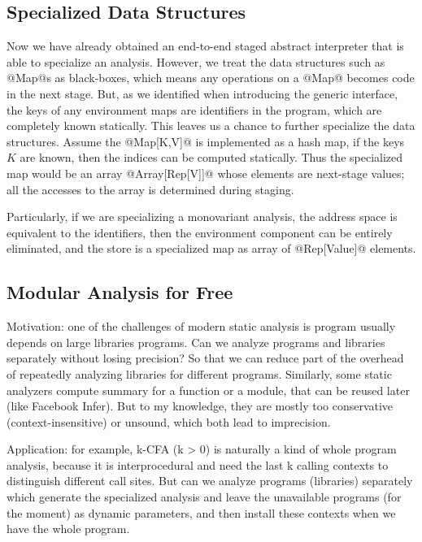 \subsection{Specialized Data Structures} \label{staged_ds}

Now we have already obtained an end-to-end staged abstract interpreter that is able to 
specialize an analysis. However, we treat the data structures such as @Map@s as black-boxes,
which means any operations on a @Map@ becomes code in the next stage.
But, as we identified when introducing the generic interface, the keys of any environment maps are 
identifiers in the program, which are completely known statically. 
This leaves us a chance to further specialize the data structures. 
Assume the @Map[K,V]@ is implemented as a hash map, if the keys $K$ are known, then the indices can be computed
statically. Thus the specialized map would be an array @Array[Rep[V]]@ whose elements 
are next-stage values; all the accesses to the array is determined during staging.

Particularly, if we are specializing a monovariant analysis, the address space 
is equivalent to the identifiers, then the environment component can be entirely eliminated, 
and the store is a specialized map as array of @Rep[Value]@ elements.

\subsection{Modular Analysis for Free}

Motivation: one of the challenges of modern static analysis is program usually depends on
large libraries programs\cite{toman_et_al:LIPIcs:2017:7121}. 
Can we analyze programs and libraries separately without losing precision? So that we can 
reduce part of the overhead of repeatedly analyzing libraries for different programs.
Similarly, some static analyzers compute summary for a function or a module, that can be reused
later (like Facebook Infer). But to my knowledge, they are mostly too conservative (context-insensitive) 
or unsound, which both lead to imprecision.

Application: for example, k-CFA (k > 0) is naturally a kind of whole program analysis,
because it is interprocedural and need the last k calling contexts to distinguish
different call sites.
But can we analyze programs (libraries) separately which generate the specialized 
analysis and leave the unavailable programs (for the moment) as dynamic parameters, 
and then install these contexts when we have the whole program.

